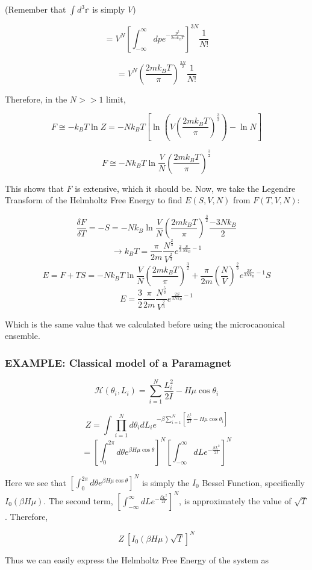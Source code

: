 \documentclass{article}
\newcommand{\pardif}[2]{\frac{\delta#1}{\delta#2}}
\newcommand{\bltz}{k_{B}}
\newcommand{\sumser}[2]{\sum\limits_{#1}^{#2}}
\begin{document}
(Remember that $\int d^{3}\mathbb{r}$ is simply $V$)
 
$$=V^{N}\left[\int_{-\infty}^{\infty}dpe^{-\frac{p^{2}}{2m\bltz T}}\right]^{3N}\frac{1}{N!}$$

$$=V^{N}(\frac{2m\bltz T}{\pi})^{\frac{3N}{2}}\frac{1}{N!}$$

Therefore, in the $N>>1$ limit,

$$F\cong-\bltz T\ln{Z}=-N\bltz T[\ln(V(\frac{2m\bltz T}{\pi})^{\frac{3}{2}})-\ln{N}]$$

$$F\cong-N\bltz T\ln{\frac{V}{N}(\frac{2m\bltz T}{\pi})^{\frac{3}{2}}}$$

This shows that $F$ is extensive, which it should be.  Now, we take the Legendre Transform of the Helmholtz Free Energy to find $E(S,V,N)$ from $F(T,V,N)$:     

$$\pardif{F}{T}=-S=-N\bltz\ln{\frac{V}{N}(\frac{2m\bltz T}{\pi})^{\frac{3}{2}}}\frac{-3N\bltz}{2}$$
$$\rightarrow\bltz T=\frac{\pi}{2m}\frac{N^{\frac{2}{3}}}{V^{\frac{2}{3}}}e^{\frac{2}{3}\frac{S}{N\bltz}-1}$$
$$E=F+TS=-N\bltz T\ln{\frac{V}{N}(\frac{2m\bltz T}{\pi})^{\frac{3}{2}}}+\frac{\pi}{2m}(\frac{N}{V})^{\frac{2}{3}}e^{\frac{2S}{3N\bltz}-1}S$$
$$E=\frac{3}{2}\frac{\pi}{2m}\frac{N^{\frac{5}{3}}}{V^{\frac{2}{3}}}e^{\frac{2S}{3N\bltz}-1}$$

Which is the same value that we calculated before using the microcanonical ensemble.

\subsubsection{EXAMPLE: Classical model of a Paramagnet}


$$\mathcal{H}(\theta_{i},L_{i})=\sumser{i=1}{N}\frac{L_{i}^{2}}{2I}-H\mu\cos{\theta_{i}}$$

$$Z=\int\prod_{i=1}^{N}d\theta_{i}dL_{i}e^{-\beta\sumser{i=1}{N}[\frac{L_{i}^{2}}{2I}-H\mu\cos{\theta_{i}}]}$$
$$=[\int_{0}^{2\pi}d\theta e^{\beta H\mu\cos{\theta}}]^{N}[\int_{-\infty}^{\infty}dLe^{-\frac{\beta L^{2}}{2I}}]^{N}$$

Here we see that $[\int_{0}^{2\pi}d\theta e^{\beta H\mu\cos{\theta}}]^{N}$ is simply the $I_{0}$ Bessel Function, specifically $I_{0}(\beta H\mu)$.  The second term, $[\int_{-\infty}^{\infty}dLe^{-\frac{\beta L^{2}}{2I}}]^{N}$, is approximately the value of $\sqrt{T}$.  Therefore,

$$Z~[I_{0}(\beta H\mu)\sqrt{T}]^{N}$$

Thus we can easily express the Helmholtz Free Energy of the system as 
\end{document}
